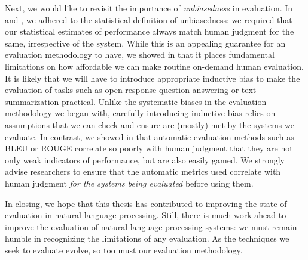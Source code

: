 Next, we would like to revisit the importance of \textit{unbiasedness} in evaluation.
In  and , we adhered to the statistical definition of unbiasedness: we required that our statistical estimates of performance always match human judgment for the same, irrespective of the system.
While this is an appealing guarantee for an evaluation methodology to have, we showed in  that it places fundamental limitations on how affordable we can make routine on-demand human evaluation.
It is likely that we will have to introduce appropriate inductive bias to make the evaluation of tasks such as open-response question answering or text summarization practical.
Unlike the systematic biases in the evaluation methodology we began with, carefully introducing inductive bias relies on assumptions that we can check and ensure are (mostly) met by the systems we evaluate.
In contrast, we showed in  that automatic evaluation methods such as BLEU or ROUGE correlate so poorly with human judgment that they are not only weak indicators of performance, but are also easily gamed.
We strongly advise researchers to ensure that the automatic metrics used correlate with human judgment \textit{for the systems being evaluated} before using them.

In closing, we hope that this thesis has contributed to improving the state of evaluation in natural language processing.
Still, there is much work ahead to improve the evaluation of natural language processing systems:
  we must remain humble in recognizing the limitations of any evaluation.
As the techniques we seek to evaluate evolve, so too must our evaluation methodology.
